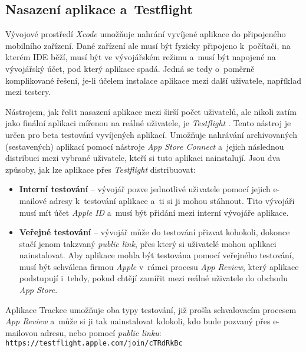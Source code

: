 \subsection{Nasazení aplikace a~Testflight}\label{testflight}

Vývojové prostředí \emph{Xcode} umožňuje nahrání vyvíjené aplikace do připojeného mobilního zařízení. Dané zařízení ale musí být fyzicky připojeno k~počítači, na kterém IDE běží, musí být ve vývojářském režimu a~musí být napojené na vývojářský účet, pod který aplikace spadá. Jedná se tedy o~poměrně komplikované řešení, je-li účelem instalace aplikace mezi další uživatele, například mezi testery.

Nástrojem, jak řešit nasazení aplikace mezi širší počet uživatelů, ale nikoli zatím jako finální aplikaci mířenou na reálné uživatele, je \emph{Testflight} \cite{testflight}. Tento nástroj je určen pro beta testování vyvíjených aplikací. Umožňuje nahrávání archivovaných (sestavených) aplikací pomocí nástroje \emph{App Store Connect} \cite{app-store-connect} a~jejich následnou distribuci mezi vybrané uživatele, kteří si tuto aplikaci nainstalují. Jsou dva způsoby, jak lze aplikace přes \emph{Testflight} distribuovat:
\begin{itemize}
\item\textbf{Interní testování} – vývojář pozve jednotlivé uživatele pomocí jejich e-mailové adresy k~testování aplikace a~ti si ji mohou stáhnout. Tito vývojáři musí mít účet \emph{Apple ID} a~musí být přidání mezi interní vývojáře aplikace.
\item\textbf{Veřejné testování} – vývojář může do testování přizvat kohokoli, dokonce stačí jenom takzvaný \emph{public link}, přes který si uživatelé mohou aplikaci nainstalovat. Aby aplikace mohla být testována pomocí veřejného testování, musí být schválena firmou \emph{Apple} v~rámci procesu \emph{App Review}, který aplikace podstupují i~tehdy, pokud chtějí zamířit mezi reálné uživatele do obchodu \emph{App Store}.
\end{itemize}

Aplikace Trackee umožňuje oba typy testování, již prošla schvalovacím procesem \emph{App Review} a~může si ji tak nainstalovat kdokoli, kdo bude pozvaný přes e-mailovou adresu, nebo pomocí \emph{public linku}: \texttt{https://testflight.apple.com/join/cTRdRkBc}

